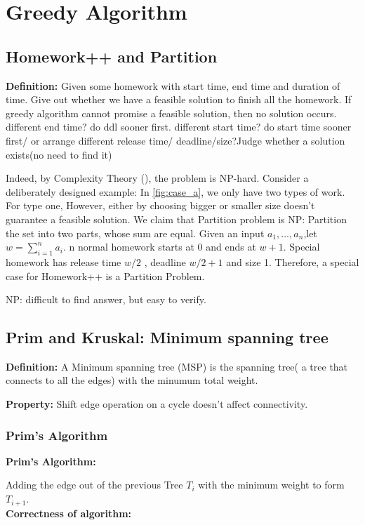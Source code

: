 \section{Greedy Algorithm}
\subsection*{Homework++ and Partition}
\textbf{Definition:}
Given some homework with start time, end time and duration of time. Give out whether we have a feasible solution to finish all the homework.
If greedy algorithm cannot promise a feasible solution, then no solution occurs.
different end time? do ddl sooner first.
different start time? do start time sooner first/ or arrange 
different release time/ deadline/size?Judge whether a solution exists(no need to find it)

Indeed, by Complexity Theory (), the problem is NP-hard. 
Consider a deliberately designed example: In \ref{fig:case_a}, we only have two types of work. For type one, 
However, either by choosing bigger or smaller size doesn't guarantee a feasible solution.
We claim that Partition problem is NP: Partition the set into two parts, whose sum are equal.
Given an input $a_1,\ldots,a_n$,let $w=\sum_{i=1}^n a_i$.
n normal homework starts at 0 and ends at $w+1$.
Special homework has release time $w/2$ , deadline $w/2+1$ and size 1.
Therefore, a special case for Homework++ is a Partition Problem.

NP: difficult to find answer, but easy to verify.

\subsection{Prim and Kruskal: Minimum spanning tree}
\textbf{Definition:}
A Minimum spanning tree (MSP) is the spanning tree( a tree that connects to all the edges) with the minumum total weight.

\textbf{Property:}
Shift edge operation on a cycle doesn't affect connectivity.

\subsubsection{Prim's Algorithm}
\textbf{Prim's Algorithm:} 

Adding the edge out of the previous Tree $T_i$ with the minimum weight to form $T_{i+1}$.\\
\textbf{Correctness of algorithm:}

